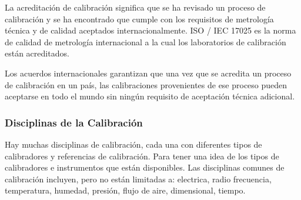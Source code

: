 		\par \noindent
			La acreditación de calibración significa que se ha revisado un proceso de calibración y se ha encontrado que cumple con los requisitos de metrología técnica y de calidad aceptados internacionalmente. ISO / IEC 17025 es la norma de calidad de metrología internacional a la cual los laboratorios de calibración están acreditados.
			
		\par \noindent
			Los acuerdos internacionales garantizan que una vez que se acredita un proceso de calibración en un país, las calibraciones provenientes de ese proceso pueden aceptarse en todo el mundo sin ningún requisito de aceptación técnica adicional.
			
\clearpage
\thispagestyle{plain}
		
	\subsubsection{Disciplinas de la Calibración}
		\par 
			Hay muchas disciplinas de calibración, cada una con diferentes tipos de calibradores y referencias de calibración. Para tener una idea de los tipos de calibradores e instrumentos que están disponibles. Las disciplinas comunes de calibración incluyen, pero no están limitadas a: electrica, radio frecuencia, temperatura, humedad, presión, flujo de aire, dimensional, tiempo.